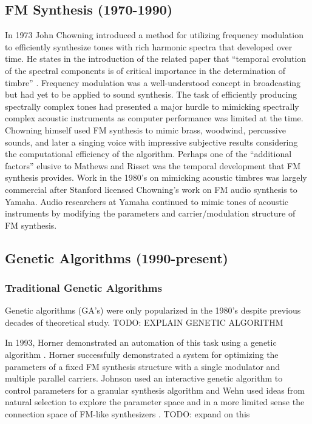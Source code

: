 \documentclass[12pt]{article}
\begin{document}
\subsection{FM Synthesis (1970-1990)}
In 1973 John Chowning introduced a method for utilizing frequency modulation to efficiently synthesize tones with rich harmonic spectra that developed over time. He states in the introduction of the related paper that ``temporal evolution of the spectral components is of critical importance in the determination of timbre'' \citep{chowning1973synthesis}. Frequency modulation was a well-understood concept in broadcasting but had yet to be applied to sound synthesis. The task of efficiently producing spectrally complex tones had presented a major hurdle to mimicking spectrally complex acoustic instruments as computer performance was limited at the time. Chowning himself used FM synthesis to mimic brass, woodwind, percussive sounds, and later a singing voice \citep{chowning1989frequency} with impressive subjective results considering the computational efficiency of the algorithm. Perhaps one of the ``additional factors'' elusive to Mathews and Risset was the temporal development that FM synthesis provides.
Work in the 1980's on mimicking acoustic timbres was largely commercial after Stanford licensed Chowning's work on FM audio synthesis to Yamaha. Audio researchers at Yamaha continued to mimic tones of acoustic instruments by modifying the parameters and carrier/modulation structure of FM synthesis.

\subsection{Genetic Algorithms (1990-present)}
\subsubsection{Traditional Genetic Algorithms}
Genetic algorithms (GA's) were only popularized in the 1980's despite previous decades of theoretical study. TODO: EXPLAIN GENETIC ALGORITHM

In 1993, Horner demonstrated an automation of this task using a genetic algorithm \citep{horner1993machine}. Horner successfully demonstrated a system for optimizing the parameters of a fixed FM synthesis structure with a single modulator and multiple parallel carriers. Johnson used an interactive genetic algorithm to control parameters for a granular synthesis algorithm \citep{johnson1999exploring} and Wehn used ideas from natural selection to explore the parameter space and in a more limited sense the connection space of FM-like synthesizers \citep{wehn1998using}. TODO: expand on this
\end{document}
